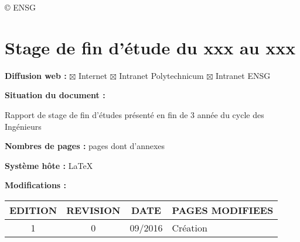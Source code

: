 \copyright \hspace{0.3cm} ENSG

\section*{Stage de fin d'étude du xxx au xxx }
\vspace{0.3cm}
\textbf{Diffusion web :} $\boxtimes$ Internet \hspace{0.2cm}$\boxtimes$ Intranet Polytechnicum\hspace{0.2cm}
$\boxtimes$ Intranet ENSG\vspace{0.3cm}

\textbf{Situation du document :} 
\vspace{0.2cm}
\par
Rapport de stage de fin d'études présenté en fin de 3 année du cycle des Ingénieurs
\vspace{0.3cm}



\textbf{Nombres de pages :}  pages dont  d'annexes
\vspace{0.3cm}

\textbf{Système hôte :} \LaTeX
\vspace{1cm}


\textbf{Modifications :} 
\begin{center}
\begin{tabular}{|c|c|c|>{\centering}p{6.5cm}|}
\hline 
EDITION & REVISION & DATE & PAGES MODIFIEES\tabularnewline
\hline
\hline 
1 & 0 & 09/2016 & Création\tabularnewline
\hline 

\end{tabular}
\end{center}